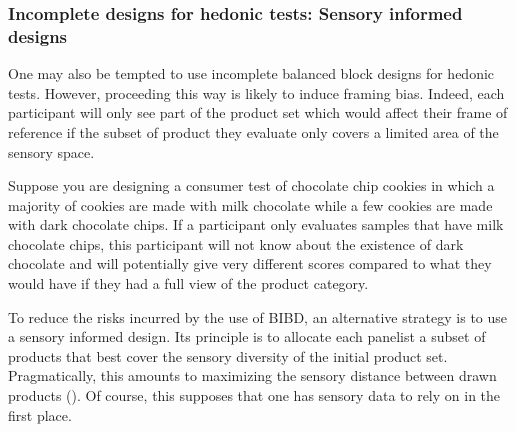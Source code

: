 \documentclass[
]{book}
\begin{document}
\hypertarget{incomplete-designs-for-hedonic-tests-sensory-informed-designs}{%
\subsubsection{Incomplete designs for hedonic tests: Sensory informed designs}\label{incomplete-designs-for-hedonic-tests-sensory-informed-designs}}

One may also be tempted to use incomplete balanced block designs for hedonic tests. However, proceeding this way is likely to induce framing bias. Indeed, each participant will only see part of the product set which would affect their frame of reference if the subset of product they evaluate only covers a limited area of the sensory space.

Suppose you are designing a consumer test of chocolate chip cookies in which a majority of cookies are made with milk chocolate while a few cookies are made with dark chocolate chips. If a participant only evaluates samples that have milk chocolate chips, this participant will not know about the existence of dark chocolate and will potentially give very different scores compared to what they would have if they had a full view of the product category.

To reduce the risks incurred by the use of BIBD, an alternative strategy is to use a sensory informed design. Its principle is to allocate each panelist a subset of products that best cover the sensory diversity of the initial product set. Pragmatically, this amounts to maximizing the sensory distance between drawn products (\citet{Franczak2015}). Of course, this supposes that one has sensory data to rely on in the first place.
\end{document}

